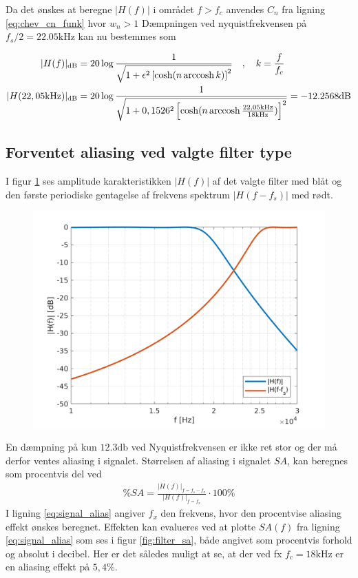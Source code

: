 Da det ønskes at beregne $|H(f)|$ i området $f > f_c$ anvendes $C_n$ fra ligning \ref{eq:chev_cn_funk} hvor $w_n > 1$
Dæmpningen ved nyquistfrekvensen på $f_s/2 = \num{22.05}\si{\kilo\hertz}$ kan nu bestemmes som

\begin{align}
|H(f)|_{\si{\decibel}} &= 20 \log \frac{1}{\sqrt{1+ \epsilon^2  \left[\cosh(n \arccosh k )\right]^2 }} \quad, \quad k = \frac{f}{f_c} \\
|H(22,05\si{\kilo\hertz})|_{\si{\decibel}} &= 20 \log \frac{1}{\sqrt{1+ 0,1526^2  \left[\cosh(n \arccosh \frac{22,05\si{\kilo\hertz}}{18\si{\kilo\hertz}} )\right]^2 }} = \num{-12.2568} \si{\decibel}
\end{align}

\subsection{Forventet aliasing ved valgte filter type}
I figur \ref{fig:filter_f_fs} ses amplitude karakteristikken $|H(f)|$ af det valgte filter med blåt og den første periodiske gentagelse af frekvens spektrum $|H(f-f_s)|$ med rødt.
\begin{figure}[h!]
	\centering
	\includegraphics[width=.8\textwidth]{matlab/filter_f_fs.png}
	\caption{}
	\label{fig:filter_f_fs}
\end{figure}

En dæmpning på kun $\num{12.3} \si{\decibel}$ ved Nyquistfrekvensen er ikke ret stor og der må derfor ventes aliasing i signalet.
Størrelsen af aliasing i signalet $SA$, kan beregnes som procentvis del ved
\begin{align}
	\%SA = \frac{|H(f)|_{f=f_s-f_x}}{|H(f)|_{f=f_x}} \cdot 100 \% \label{eq:signal_alias}
\end{align} 
I ligning \ref{eq:signal_alias} angiver $f_x$ den frekvens, hvor den procentvise aliasing effekt ønskes beregnet.
Effekten kan evalueres ved at plotte $SA(f)$ fra ligning \ref{eq:signal_alias} som ses i figur \ref{fig:filter_sa}, både angivet som procentvis forhold og absolut i decibel.
Her er det således muligt at se, at der ved fx $f_c=\num{18}\si{\kilo\hertz}$ er en aliasing effekt på $5,4\%$.

